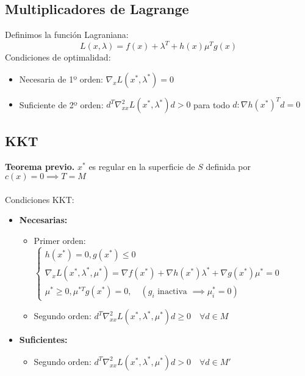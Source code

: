 \documentclass[leqno]{article}
\begin{document}
\subsection{Multiplicadores de Lagrange}
Definimos la función Lagraniana:
\[
L(x, \lambda) = f(x) + \lambda^T + h(x) \mu^Tg(x)
\] 
Condiciones de optimalidad:
\begin{itemize}
  \item Necesaria de 1º orden: $\nabla_xL(x^*, \lambda^*) = 0 $
  \item Suficiente de 2º orden: $d^T\nabla^2_{x x}L(x^*, \lambda^*)d>0$ para todo $d: \nabla h(x^*)^Td = 0$
\end{itemize}

\subsection{KKT}
\textbf{Teorema previo.} $x^*$ es regular en la superficie de $S$ definida por $c(x)=0 \implies T=M$ \\
\\
Condiciones KKT:
\begin{itemize}
  \item \textbf{Necesarias:}
	\begin{itemize}
	  \item Primer orden: $\begin{cases} h(x^*) = 0, g(x^*) \le 0 \\ \nabla_xL(x^*, \lambda^*, \mu^*) = \nabla f(x^*) + \nabla h(x^*)\lambda^* + \nabla g(x^*)\mu^* = 0 \\ \mu^*\geq 0, \mu^{*T}g(x^*) = 0, \quad (g_i \text{ inactiva } \implies \mu^*_i = 0) \end{cases}$
	  \item Segundo orden: $d^T\nabla^2_{x x} L(x^*, \lambda^*, \mu^*)d \geq 0 \quad \forall d \in M$ 
	\end{itemize}
  \item \textbf{Suficientes:}
	\begin{itemize}
	  \item Segundo orden: $d^T\nabla^2_{x x}L(x^*, \lambda^*, \mu^*) d > 0 \quad \forall d\in M'$ 
	\end{itemize}
\end{itemize}
\end{document}

